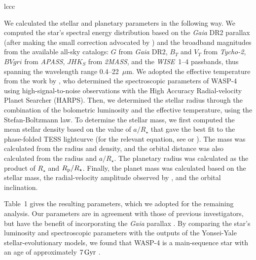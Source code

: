\documentclass[12pt,twocolumn,tighten]{aastex62}
\begin{document}
{\begin{deluxetable}{lccc}

\vspace{-1cm}
\end{deluxetable}

We calculated the stellar and planetary parameters in the following
way.  We computed the star's spectral energy distribution based on the
{\it Gaia} DR2 parallax (after making the small correction advocated
by \citealt{stassun_evidence_2018}) and the broadband magnitudes from
the available all-sky catalogs: $G$ from {\it Gaia\/} DR2, $B_T$ and
$V_T$ from {\it Tycho-2}, $BVgri$ from {\it APASS}, $JHK_S$ from {\it
2MASS}, and the {\it WISE}~1--4 passbands, thus spanning the
wavelength range 0.4--22~$\mu$m.  We adopted the effective temperature
from the work by \citet{doyle_accurate_2013}, who determined the
spectroscopic parameters of WASP-4 using high-signal-to-noise
observations with the High Accuracy Radial-velocity Planet Searcher
(HARPS).  Then, we determined the stellar radius through the
combination of the bolometric luminosity and the effective
temperature, using the Stefan-Boltzmann law.  To determine the stellar
mass, we first computed the mean stellar density based on the value of
$a/R_\star$ that gave the best fit to the phase-folded TESS lightcurve
(for the relevant equation, see \citealt{seager_unique_2003} or
\citealt{winn_exoplanet_2010}).  The mass was calculated from the
radius and density, and the orbital distance was also calculated from
the radius and $a/R_\star$.  The planetary radius was calculated as
the product of $R_\star$ and $R_{\rm p}/R_\star$.  Finally, the planet
mass was calculated based on the stellar mass, the radial-velocity
amplitude observed by \citet{triaud_spin-orbit_2010}, and the orbital
inclination.

Table~1 gives the resulting parameters, which we adopted for the
remaining analysis.   Our  parameters are in agreement
with those of previous investigators, but have the benefit of
incorporating the {\it Gaia} parallax
\citep{wilson_wasp-4b_2008,gillon_discovery_2009,winn_transit_2009,southworth_homogeneous_2011,petrucci_no_2013,huitson_gemini_2017}.
By comparing the star's luminosity and spectroscopic parameters with
the outputs of the Yonsei-Yale stellar-evolutionary models, we found
that WASP-4 is a main-sequence star with an age of approximately
$7\,{\rm Gyr}$ .


}
\end{document}
